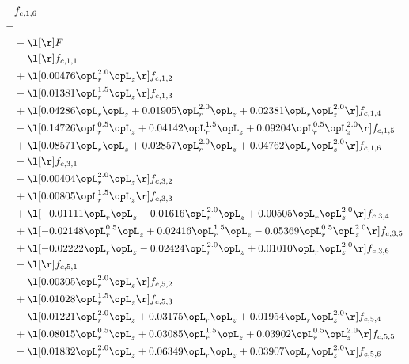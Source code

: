 \begin{alignat}{2} 
\label{eq:f_16_1} 
& f_{c,1,6} \nonumber \\ 
 = \\ 
& - \l[  \r] F \nonumber \\ 
& - \l[  \r] f_{c,1,1} \nonumber \\ 
& + \l[  0.00476 \opL_r^{2.0} \opL_z  \r] f_{c,1,2} \nonumber \\ 
& - \l[  0.01381 \opL_r^{1.5} \opL_z  \r] f_{c,1,3} \nonumber \\ 
& + \l[  0.04286 \opL_r \opL_z +  0.01905 \opL_r^{2.0} \opL_z +  0.02381 \opL_r \opL_z^{2.0}  \r] f_{c,1,4} \nonumber \\ 
& - \l[  0.14726 \opL_r^{0.5} \opL_z +  0.04142 \opL_r^{1.5} \opL_z +  0.09204 \opL_r^{0.5} \opL_z^{2.0}  \r] f_{c,1,5} \nonumber \\ 
& + \l[  0.08571 \opL_r \opL_z +  0.02857 \opL_r^{2.0} \opL_z +  0.04762 \opL_r \opL_z^{2.0}  \r] f_{c,1,6} \nonumber \\ 
& - \l[  \r] f_{c,3,1} \nonumber \\ 
& - \l[  0.00404 \opL_r^{2.0} \opL_z  \r] f_{c,3,2} \nonumber \\ 
& + \l[  0.00805 \opL_r^{1.5} \opL_z  \r] f_{c,3,3} \nonumber \\ 
& + \l[  -0.01111 \opL_r \opL_z   -0.01616 \opL_r^{2.0} \opL_z +  0.00505 \opL_r \opL_z^{2.0}  \r] f_{c,3,4} \nonumber \\ 
& + \l[  -0.02148 \opL_r^{0.5} \opL_z +  0.02416 \opL_r^{1.5} \opL_z   -0.05369 \opL_r^{0.5} \opL_z^{2.0}  \r] f_{c,3,5} \nonumber \\ 
& + \l[  -0.02222 \opL_r \opL_z   -0.02424 \opL_r^{2.0} \opL_z +  0.01010 \opL_r \opL_z^{2.0}  \r] f_{c,3,6} \nonumber \\ 
& - \l[  \r] f_{c,5,1} \nonumber \\ 
& - \l[  0.00305 \opL_r^{2.0} \opL_z  \r] f_{c,5,2} \nonumber \\ 
& + \l[  0.01028 \opL_r^{1.5} \opL_z  \r] f_{c,5,3} \nonumber \\ 
& - \l[  0.01221 \opL_r^{2.0} \opL_z +  0.03175 \opL_r \opL_z +  0.01954 \opL_r \opL_z^{2.0}  \r] f_{c,5,4} \nonumber \\ 
& + \l[  0.08015 \opL_r^{0.5} \opL_z +  0.03085 \opL_r^{1.5} \opL_z +  0.03902 \opL_r^{0.5} \opL_z^{2.0}  \r] f_{c,5,5} \nonumber \\ 
& - \l[  0.01832 \opL_r^{2.0} \opL_z +  0.06349 \opL_r \opL_z +  0.03907 \opL_r \opL_z^{2.0}  \r] f_{c,5,6} \nonumber \\ 

\end{alignat}
